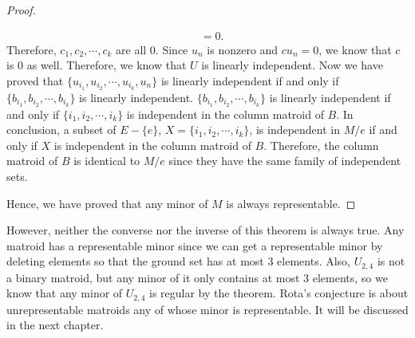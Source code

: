 \begin{proof}
\begin{enumerate}
\begin{align*}
  &= 0.\end{align*}
  Therefore, $c_1, c_2, \cdots, c_k$ are all 0.
  Since $u_n$ is nonzero and $c u_n = 0$, we know that $c$ is 0 as well.
  Therefore, we know that $U$ is linearly independent.
  Now we have proved that $\{ u_{i_1}, u_{i_2}, \cdots, u_{i_k}, u_{n} \}$ is linearly independent 
  if and only if $\{ b_{i_1}, b_{i_2}, \cdots, b_{i_k} \}$ is linearly independent.
  $\{ b_{i_1}, b_{i_2}, \cdots, b_{i_k} \}$ is linearly independent if and only if $\{ i_1, i_2, \cdots, i_k \}$ is independent in the column matroid of $B$. 
  In conclusion, a subset of $E - \{ e \}$, $X = \{ i_1, i_2, \cdots, i_k \}$, is independent in $M / e$ if and only if $X$ is independent in the column matroid of $B$.
  Therefore, the column matroid of $B$ is identical to $M / e$ since they have the same family of independent sets.
\end{enumerate}
Hence, we have proved that any minor of $M$ is always representable.
\end{proof}

However, neither the converse nor the inverse of this theorem is always true.
Any matroid has a representable minor since we can get a representable minor by deleting elements so that the ground set has at most 3 elements.
Also, $U_{2, 4}$ is not a binary matroid, but any minor of it only contains at most 3 elements, so we know that any minor of $U_{2,4}$ is regular by the theorem.
Rota's conjecture is about unrepresentable matroids any of whose minor is representable.
It will be discussed in the next chapter.


